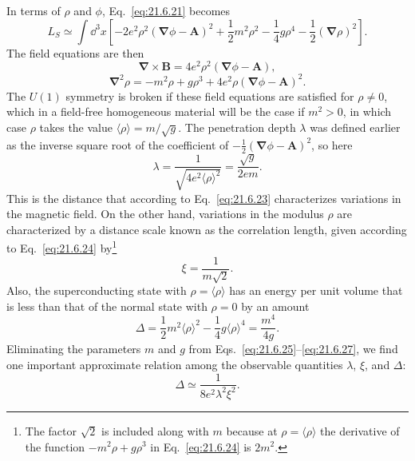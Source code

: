 In terms of $\rho$ and $\phi$, Eq.~\eqref{eq:21.6.21} becomes
\begin{equation}
L_S\simeq\int \dd^3x\left[
-2e^2\rho^2(\boldsymbol\nabla\phi-\mathbf A)^2
+\frac12m^2\rho^2
-\frac14g\rho^4
-\frac12(\boldsymbol\nabla\rho)^2
\right].
\tag{21.6.22}\label{eq:21.6.22}
\end{equation}
The field equations are then
\begin{equation}
\boldsymbol\nabla\mathbin{\times}\mathbf B
=4e^2\rho^2(\boldsymbol\nabla\phi-\mathbf A),
\tag{21.6.23}\label{eq:21.6.23}
\end{equation}
\begin{equation}
\boldsymbol\nabla^2\rho
=-m^2\rho+g\rho^3
+4e^2\rho(\boldsymbol\nabla\phi-\mathbf A)^2.
\tag{21.6.24}\label{eq:21.6.24}
\end{equation}
The $U(1)$ symmetry is broken if these field equations are satisfied for $\rho\ne0$, which in a field-free homogeneous material will be the case if $m^2>0$, in which case $\rho$ takes the value $\langle\rho\rangle=m/\sqrt g$. The penetration depth $\lambda$ was defined earlier as the inverse square root of the coefficient of $-\frac12(\boldsymbol\nabla\phi-\mathbf A)^2$, so here
\begin{equation}
\lambda=\frac{1}{\sqrt{4e^2\langle\rho\rangle^2}}
=\frac{\sqrt g}{2em}.
\tag{21.6.25}\label{eq:21.6.25}
\end{equation}
This is the distance that according to Eq.~\eqref{eq:21.6.23} characterizes variations in the magnetic field. On the other hand, variations in the modulus $\rho$ are characterized by a distance scale known as the correlation length, given according to Eq.~\eqref{eq:21.6.24} by\footnote{The factor $\sqrt2$ is included along with $m$ because at $\rho=\langle\rho\rangle$ the derivative of the function $-m^2\rho+g\rho^3$ in Eq.~\eqref{eq:21.6.24} is $2m^2$.}
\begin{equation}
\xi=\frac{1}{m\sqrt2}.
\tag{21.6.26}\label{eq:21.6.26}
\end{equation}
Also, the superconducting state with $\rho=\langle\rho\rangle$ has an energy per unit volume that is less than that of the normal state with $\rho=0$ by an amount
\begin{equation}
\Delta=\frac12m^2\langle\rho\rangle^2
-\frac14g\langle\rho\rangle^4
=\frac{m^4}{4g}.
\tag{21.6.27}\label{eq:21.6.27}
\end{equation}
Eliminating the parameters $m$ and $g$ from Eqs.~\eqref{eq:21.6.25}--\eqref{eq:21.6.27}, we find one important approximate relation among the observable quantities $\lambda$, $\xi$, and $\Delta$:
\begin{equation}
\Delta\simeq\frac{1}{8e^2\lambda^2\xi^2}.
\tag{21.6.28}\label{eq:21.6.28}
\end{equation}

